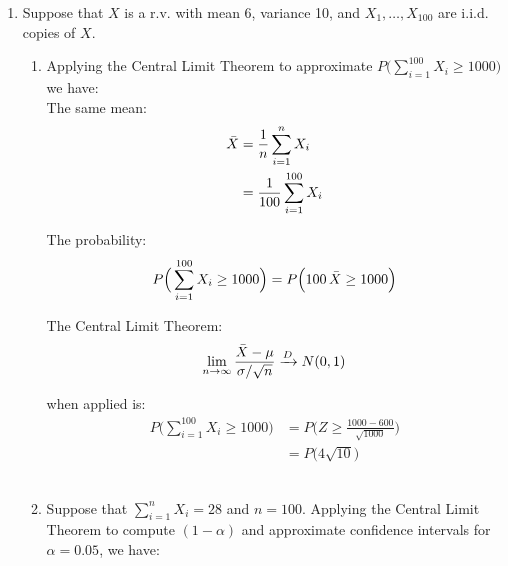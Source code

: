\documentclass{article}
\begin{document}
\begin{enumerate}
    \item Suppose that $X$ is a r.v. with mean 6, variance 10, and $X_1,\hdots,X_{100}$ are i.i.d. copies of $X$.

    \begin{enumerate}
        \item Applying the Central Limit Theorem to approximate $P\Big( \sum_{i=1}^{100}X_i \geq 1000\Big)$ we have:\\

        The same mean:
        \begin{equation}
            \begin{split}
                \Bar{X} &= \frac{1}{n} \sum_{i=1}^{n} X_i\\
                &= \frac{1}{100} \sum_{i=1}^{100} X_i\\
            \end{split}
        \end{equation}

        The probability:
        \begin{equation}
            \begin{split}
                P\Big( \sum_{i=1}^{100}X_i \geq 1000\Big) &= P\Big(100 \, \Bar{X} \geq 1000\Big)\\
            \end{split}
        \end{equation}

        The Central Limit Theorem:
        \begin{equation}
            \lim_{n \to \infty} \frac{\Bar{X}-\mu}{\sigma/\sqrt{n}} \xrightarrow{D} N(0, 1)
        \end{equation}

        when applied is:
        \begin{equation}
            \begin{split}
                P\Big( \sum_{i=1}^{100}X_i \geq 1000\Big) 
                &= P\Big(Z \geq \frac{1000 - 600}{\sqrt{1000}}\Big)\\
                &= P\Big(4\sqrt{10}\Big)
            \end{split}
        \end{equation}\\

        \item Suppose that $\sum_{i=1}^{n}X_i = 28$ and $n=100$. Applying the Central Limit Theorem to compute $(1 - \alpha)$ and approximate confidence intervals for $\alpha = 0.05$, we have:\\


\end{enumerate}
\end{enumerate}
\end{document}
